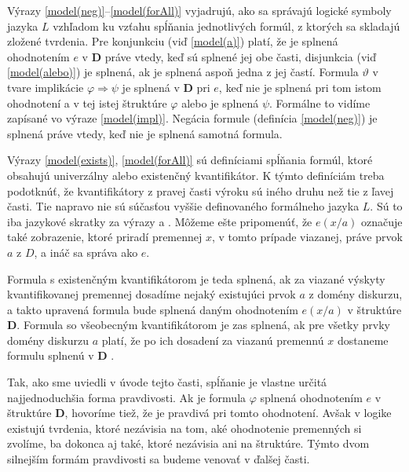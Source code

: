 \documentclass[12pt, letterpaper]{article}
\begin{document}
\noindent Výrazy \ref{model(neg)}--\ref{model(forAll)} vyjadrujú, ako sa správajú logické symboly jazyka $L$ vzhľadom ku vzťahu spĺňania jednotlivých formúl, z ktorých sa skladajú zložené tvrdenia. 
Pre konjunkciu (viď \ref{model(a)}) platí, že je splnená ohodnotením $e$ v \textbf{D} práve vtedy, keď sú splnené jej obe časti, disjunkcia (viď \ref{model(alebo)}) je splnená, ak je splnená aspoň jedna z jej častí. Formula $\vartheta$ v tvare implikácie $\varphi \Rightarrow \psi$ je splnená v \textbf{D} pri $e$, keď nie je splnená pri tom istom ohodnotení a v tej istej štruktúre $\varphi$ alebo je splnená $\psi$. Formálne to vidíme zapísané vo výraze \ref{model(impl)}. Negácia formule (definícia \ref{model(neg)}) je splnená práve vtedy, keď nie je splnená samotná formula.\par
Výrazy \ref{model(exists)}, \ref{model(forAll)} sú definíciami spĺňania formúl, ktoré obsahujú univerzálny alebo existenčný kvantifikátor. K týmto definíciám treba podotknúť, že kvantifikátory z pravej časti výroku sú iného druhu než tie z ľavej časti. Tie napravo nie sú súčasťou vyššie definovaného formálneho jazyka $L$. Sú to iba jazykové skratky za výrazy  a . Môžeme ešte pripomenúť, že $e(x/a)$ označuje také zobrazenie, ktoré priradí premennej $x$, v tomto prípade viazanej, práve prvok $a$ z $D$, a ináč sa správa ako $e$.\par
Formula s existenčným kvantifikátorom je teda splnená, ak za viazané výskyty kvantifikovanej premennej dosadíme nejaký existujúci prvok $a$ z domény diskurzu, a takto upravená formula bude splnená daným ohodnotením $e(x/a)$ v štruktúre \textbf{D}. Formula so všeobecným kvantifikátorom je zas splnená, ak pre všetky prvky domény diskurzu $a$ platí, že po ich dosadení za viazanú premennú $x$ dostaneme formulu splnenú v \textbf{D} \parencites[49--50]{raclavsky_uvod_2015}{shapiro_classical_2022}[143]{svejdar_logika_2002}.\par 

Tak, ako sme uviedli v úvode tejto časti, spĺňanie je vlastne určitá najjednoduchšia forma pravdivosti. Ak je formula $\varphi$ splnená ohodnotením $e$ v štruktúre \textbf{D}, hovoríme tiež, že je pravdivá pri tomto ohodnotení. Avšak v logike existujú tvrdenia, ktoré nezávisia na tom, aké ohodnotenie premenných si zvolíme, ba dokonca aj také, ktoré nezávisia ani na štruktúre. Týmto dvom silnejším formám pravdivosti sa budeme venovať v ďalšej časti.
\end{document}

